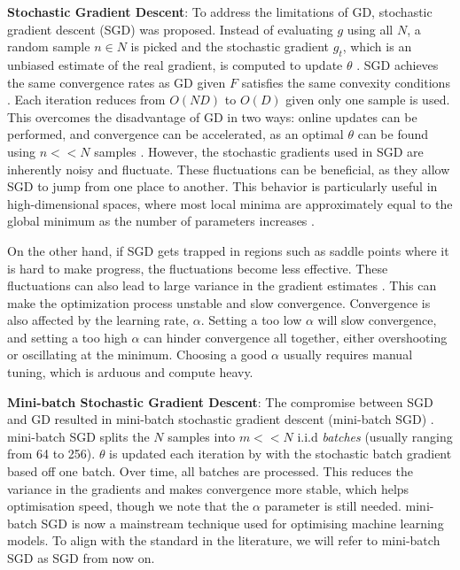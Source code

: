 \textbf{Stochastic Gradient Descent}: To address the limitations of GD, stochastic gradient descent (SGD) was proposed. Instead of evaluating $g$ using all $N$, a random sample $n \in N$ is picked and the stochastic gradient $g_t$, which is an unbiased estimate of the real gradient, is computed to update $\theta$ \citep{robbins1951stochastic}. SGD achieves the same convergence rates as GD given $F$ satisfies the same convexity conditions \citep{johnson2013accelerating, nemirovski2009robust}. Each iteration reduces from $O(ND)$ to $O(D)$ given only one sample is used.
This overcomes the disadvantage of GD in two ways: online updates can be performed, and convergence can be accelerated, as an optimal $\theta$ can be found using $n << N$ samples \citep{johnson2013accelerating, nemirovski2009robust}. However, the stochastic gradients used in SGD are inherently noisy and fluctuate. These fluctuations can be beneficial, as they allow SGD to jump from one place to another. This behavior is particularly useful in high-dimensional spaces, where most local minima are approximately equal to the global minimum as the number of parameters increases \citep{dauphin2014sfn, choromanska2015loss}.

On the other hand, if SGD gets trapped in regions such as saddle points where it is hard to make progress, the fluctuations become less effective. These fluctuations can also lead to large variance in the gradient estimates \citep{sun2019survey}. This can make the optimization process unstable and slow convergence. Convergence is also affected by the learning rate, $\alpha$. Setting a too low $\alpha$ will slow convergence, and setting a too high $\alpha$ can hinder convergence all together, either overshooting or oscillating at the minimum. Choosing a good $\alpha$ usually requires manual tuning, which is arduous and compute heavy.

\textbf{Mini-batch Stochastic Gradient Descent}: The compromise between SGD and GD resulted in mini-batch stochastic gradient descent (mini-batch SGD) \citep{robbins1951stochastic}. mini-batch SGD splits the $N$ samples into $m << N$ i.i.d \textit{batches} (usually ranging from 64 to 256). $\theta$ is updated each iteration by with the stochastic batch gradient based off one batch. Over time, all batches are processed. This reduces the variance in the gradients and makes convergence more stable, which helps optimisation speed, though we note that the $\alpha$ parameter is still needed. mini-batch SGD is now a mainstream technique used for optimising machine learning models. To align with the standard in the literature, we will refer to mini-batch SGD as SGD from now on.

